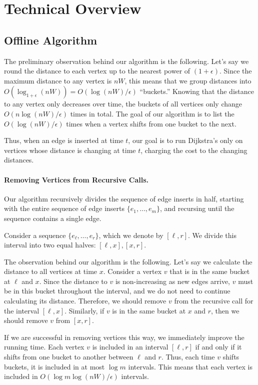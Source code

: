 \section{Technical Overview}
\label{sec:technical}

\subsection{Offline Algorithm}
The preliminary observation behind our algorithm is the following. Let's say we round the distance to each vertex up to the nearest power of $(1 + \epsilon)$.  Since the maximum distance to any vertex is $nW$, this means that we group distances into $O(\log_{1 + \epsilon} (nW)) = O(\log (nW)/\epsilon)$ ``buckets.''  Knowing that the distance to any vertex only decreases over time, the buckets of all vertices only change $O(n\log (nW)/\epsilon)$ times in total.  The goal of our algorithm is to list the $O(\log (nW)/\epsilon)$ times when a vertex shifts from one bucket to the next.

Thus, when an edge is inserted at time $t$, our goal is to run Dijkstra's only on vertices whose distance is changing at time $t$, charging the cost to the changing distances.  

\paragraph{Removing Vertices from Recursive Calls.} 
Our algorithm recursively divides the sequence of edge inserts in half, starting with the entire sequence of edge inserts $\{e_1, \ldots, e_m\}$, and recursing until the sequence contains a single edge.   

Consider a sequence $\{e_{\ell}, \ldots, e_r\}$, which we denote by $[\ell, r]$.  We divide this interval into two equal halves: $[\ell, x], [x, r]$.  

The observation behind our algorithm is the following.  Let's say we calculate the distance to all vertices at time $x$.  Consider a vertex $v$ that is in the same bucket at $\ell$ and $x$.
Since the distance to $v$ is non-increasing as new edges arrive, $v$ must be in this bucket throughout the interval, and we do not need to continue calculating its distance. 
Therefore, we should remove $v$ from the recursive call for the interval $[\ell, x]$.  
Similarly, if $v$ is in the same bucket at $x$ and $r$, then we should remove $v$ from $[x, r]$.

If we are successful in removing vertices this way, we immediately improve the running time.  Each vertex $v$ is included in an interval $[\ell, r]$ if and only if it shifts from one bucket to another between $\ell$ and $r$.  Thus, each time $v$ shifts buckets, it is included in at most $\log m$ intervals.  This means that each vertex is included in $O(\log m \log (nW)/\epsilon)$ intervals.  
 
